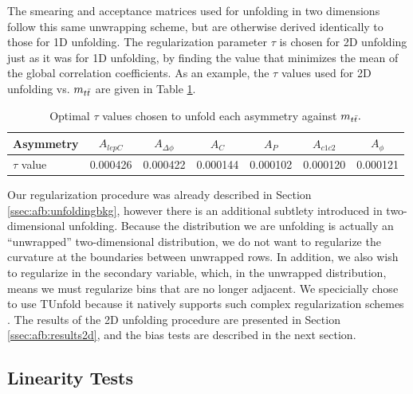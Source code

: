 The smearing and acceptance matrices used for unfolding in two
dimensions follow this same unwrapping scheme, but are otherwise
derived identically to those for 1D unfolding.
The regularization parameter $\tau$ is chosen for 2D unfolding just as
it was for 1D unfolding, by finding the value that minimizes the mean
of the global correlation coefficients. As an example, the $\tau$
values used for 2D unfolding vs. $m_{t\bar{t}}$ are given in Table
\ref{tab:afb:tau2d}.

\begin{table}[htpb]
\begin{center}
\caption{Optimal $\tau$ values chosen to unfold each asymmetry against
$m_{t\bar{t}}.$}
\label{tab:afb:tau2d}
\begin{tabular}{l | c  c  c  c  c  c }
\hline
Asymmetry & $A_{lepC}$ & $A_{\Delta\phi}$ & $A_{C}$ & $A_{P}$ & $A_{c1c2}$ & $A_{\phi}$ \\ \hline
$\tau$ value & 0.000426 & 0.000422 & 0.000144 & 0.000102 & 0.000120 & 0.000121 \\ \hline
\end{tabular}
\end{center}
\end{table}

Our regularization procedure was already described in Section
\ref{ssec:afb:unfoldingbkg}, however there is an additional subtlety
introduced in two-dimensional unfolding. Because the distribution we
are unfolding is actually an ``unwrapped'' two-dimensional
distribution, we do not want to regularize the curvature at the
boundaries between unwrapped rows. In addition, we also wish to
regularize in the secondary variable, which, in the unwrapped
distribution, means we must regularize bins that are no longer
adjacent. We specicially chose to use TUnfold because it natively supports such
complex regularization schemes \cite{tunfold}. The results of the 2D unfolding
procedure are presented in Section \ref{ssec:afb:results2d}, and the
bias tests are described in the next section.

\subsection{Linearity Tests}
\label{ssec:afb:unfoldingtests}

